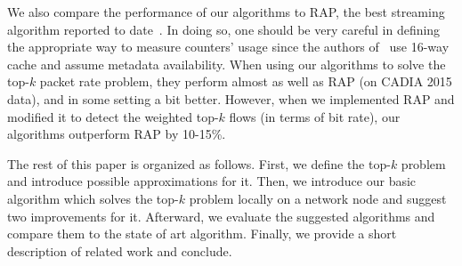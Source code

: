 We also compare the performance of our algorithms to RAP, the best streaming algorithm reported to date~\cite{Ben-Basat2017}. In doing so, one should be very careful in defining the appropriate way to measure counters' usage since the authors of~\cite{Ben-Basat2017} use 16-way cache and assume metadata availability. When using our algorithms to solve the top-$k$ packet rate problem, they perform almost as well as RAP (on CADIA 2015 data), and in some setting a bit better. However, when we implemented RAP and modified it to detect the weighted top-$k$ flows (in terms of bit rate), our algorithms outperform RAP by 10-15\%.

The rest of this paper is organized as follows. First, we define the top-$k$ problem and introduce possible approximations for it. Then, we introduce our basic algorithm which solves the top-$k$ problem locally on a network node and suggest two improvements for it. Afterward, we evaluate the suggested algorithms and compare them to the state of art algorithm. Finally, we provide a short description of related work and conclude.
